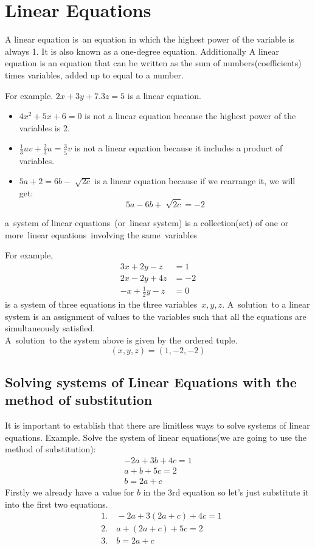 \section{Linear Equations}

A linear equation is an equation in which the highest power of the variable is always 1. It is also known as a one-degree equation. 
Additionally A linear equation is an equation that can be written as the sum of numbers(coefficients) times variables, added up to equal to a number.

For example. $ 2x + 3y + 7.3z = 5 $ is a linear equation.

\begin{itemize}
    \item $4x^2 + 5x + 6 = 0$ is not a linear equation because the highest power of the variables is 2.
    \item $ \frac{1}{3}uv + \frac{2}{3}u = \frac{3}{5}v $ is not a linear equation because it includes a product of variables.
    \item $ 5a + 2 = 6b - \sqrt[]{2c}  $ is a linear equation because if we rearrange it, we will get: 
    $$ 5a - 6b + \sqrt[]{2c} = -2 $$
\end{itemize}

a system of linear equations (or linear system) is a collection(set) of one or more linear equations involving the same variables

For example, 
\begin{align*}
    3x + 2y - z &= 1 \\
    2x - 2y + 4z &= -2 \\
    -x + \frac{1}{2}y -z &= 0
\end{align*}
is a system of three equations in the three variables $x, y, z$. A solution to a linear system is an assignment of values to the variables such that all the equations are simultaneously satisfied. \\
A solution to the system above is given by the ordered tuple.
$$ {\displaystyle (x,y,z)=(1,-2,-2)} $$  
\subsection{Solving systems of Linear Equations with the method of substitution}
It is important to establish that there are limitless ways to solve systems of linear equations. 
Example. Solve the system of linear equations(we are going to use the method of substitution): 
\begin{align*}
    -2a + 3b + 4c = 1 \\
    a + b + 5c = 2 \\
    b = 2a + c
\end{align*}
Firstly we already have a value for $b$ in the 3rd equation so let's just substitute it into the first two equations.
\begin{align*}
    &1. \quad -2a + 3(2a + c) + 4c = 1 \\
    &2. \quad a + (2a + c) + 5c = 2 \\ 
    &3. \quad  b = 2a + c   
\end{align*}

